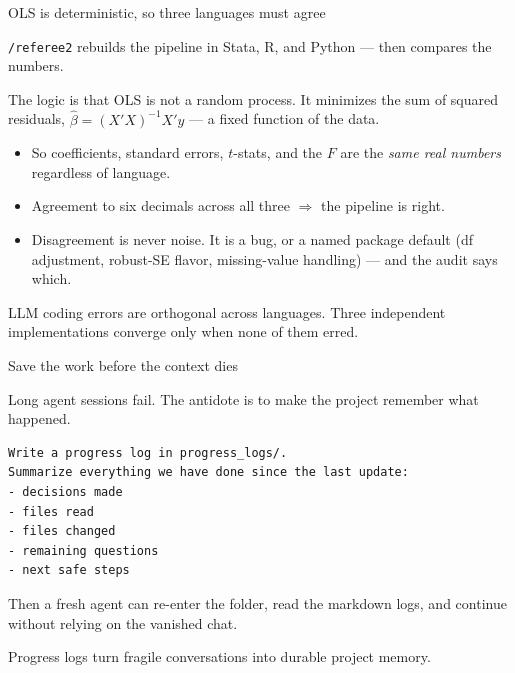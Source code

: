 \documentclass[aspectratio=169,11pt]{beamer}
\begin{document}
  \begin{frame}{OLS is deterministic, so three languages must agree}

  \texttt{/referee2} rebuilds the pipeline in Stata, R, and Python --- then compares the numbers.

  \vspace{0.3cm}

  The logic is that OLS is not a random process. It minimizes the sum of squared residuals, $\hat\beta = (X'X)^{-1}X'y$ --- a fixed function of the data.

  \vspace{0.3cm}

  \begin{itemize}\setlength\itemsep{0.35em}
      \item So coefficients, standard errors, $t$-stats, and the $F$ are the \emph{same real numbers} regardless of language.
      \item Agreement to six decimals across all three $\Rightarrow$ the pipeline is right.
      \item Disagreement is never noise. It is a bug, or a named package default (df adjustment, robust-SE flavor, missing-value handling) --- and the audit says which.
  \end{itemize}

  \vspace{0.35cm}

  \alert{LLM coding errors are orthogonal across languages. Three independent implementations converge only when none of them erred.}

  \end{frame}

\begin{frame}[fragile]{Save the work before the context dies}

Long agent sessions fail. The antidote is to make the project remember what happened.

\vspace{0.25cm}

\begin{verbatim}
Write a progress log in progress_logs/.
Summarize everything we have done since the last update:
- decisions made
- files read
- files changed
- remaining questions
- next safe steps
\end{verbatim}

\vspace{0.25cm}

Then a fresh agent can re-enter the folder, read the markdown logs, and continue without relying on the vanished chat.

\vspace{0.25cm}

\alert{Progress logs turn fragile conversations into durable project memory.}

\end{frame}
\end{document}
